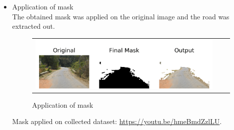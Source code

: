\documentclass[12pt,a4paper]{article}
\begin{document}
\begin{itemize}
\begin{figure}[!ht]
\begin{center}
\end{center}
\end{figure} 


\item Application of mask \\
    The obtained mask was applied on the original image and the road was extracted out. 

\begin{figure}[!ht]
\begin{center}

\begin{tabular}{ccc}
\centering
\includegraphics[width = 5in]{images/output.png}
\end{tabular}
\caption{Application of mask}

\end{center}
\end{figure} 

    Mask applied on collected dataset: \url{https://youtu.be/hmeBmdZzlLU}.

    
% 
 
\newpage     
 

\end{itemize}
\end{document}
